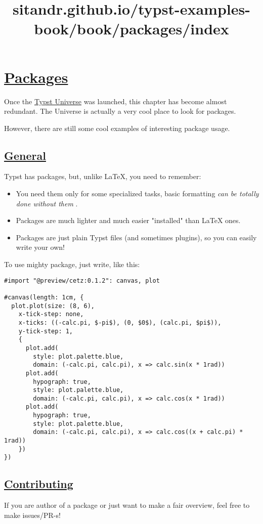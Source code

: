 \title{sitandr.github.io/typst-examples-book/book/packages/index}

\section{\texorpdfstring{\hyperref[packages]{Packages}}{Packages}}\label{packages}

Once the \href{https://typst.app/universe}{Typst Universe} was launched,
this chapter has become almost redundant. The Universe is actually a
very cool place to look for packages.

However, there are still some cool examples of interesting package
usage.

\subsection{\texorpdfstring{\hyperref[general]{General}}{General}}\label{general}

Typst has packages, but, unlike LaTeX, you need to remember:

\begin{itemize}
\tightlist
\item
  You need them only for some specialized tasks, basic formatting
  \emph{can be totally done without them} .
\item
  Packages are much lighter and much easier "installed" than LaTeX ones.
\item
  Packages are just plain Typst files (and sometimes plugins), so you
  can easily write your own!
\end{itemize}

To use mighty package, just write, like this:

\begin{verbatim}
#import "@preview/cetz:0.1.2": canvas, plot

#canvas(length: 1cm, {
  plot.plot(size: (8, 6),
    x-tick-step: none,
    x-ticks: ((-calc.pi, $-pi$), (0, $0$), (calc.pi, $pi$)),
    y-tick-step: 1,
    {
      plot.add(
        style: plot.palette.blue,
        domain: (-calc.pi, calc.pi), x => calc.sin(x * 1rad))
      plot.add(
        hypograph: true,
        style: plot.palette.blue,
        domain: (-calc.pi, calc.pi), x => calc.cos(x * 1rad))
      plot.add(
        hypograph: true,
        style: plot.palette.blue,
        domain: (-calc.pi, calc.pi), x => calc.cos((x + calc.pi) * 1rad))
    })
})
\end{verbatim}

\pandocbounded{}

\subsection{\texorpdfstring{\hyperref[contributing]{Contributing}}{Contributing}}\label{contributing}

If you are author of a package or just want to make a fair overview,
feel free to make issues/PR-s!
